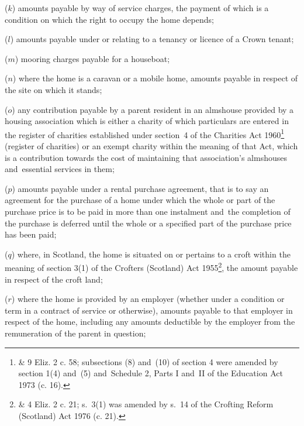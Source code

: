 \documentclass[12pt,a4paper]{article}
\begin{document}
\begin{enumerate}
($k$) 
amounts payable by way of  %
service charges, the payment of which is a condition on which the right to occupy the home depends;

($l$) 
amounts payable  %
under or relating to a tenancy or licence of a Crown tenant;

($m$) mooring charges payable for a houseboat;

($n$) where the home is a caravan or a mobile home, 
amounts payable  %
in respect of the site on which it stands;

($o$) any contribution payable by a parent resident in an almshouse provided by a housing association which is either a charity of which particulars are entered in the register of charities established under section~4 of the Charities Act 1960\footnote{ \& 9 Eliz. 2 c. 58; subsections (8) and~(10) of section 4 were amended by section 1(4) and~(5) and~Schedule 2, Parts I and~II of the Education Act 1973 (c. 16).} (register of charities) or an exempt charity within the meaning of that Act, which is a contribution towards the cost of maintaining that association’s almshouses and~essential services in them;%

($p$) 
amounts payable  %
under a rental purchase agreement, that is to say an agreement for the purchase of a home under which the whole or part of the purchase price is to be paid in more than one instalment and~the completion of the purchase is deferred until the whole or a specified part of the purchase price has been paid;

($q$) where, in Scotland, the home is situated on or pertains to a croft within the meaning of section 3(1) of the Crofters (Scotland) Act 1955\footnote{ \& 4 Eliz. 2 c. 21; s.~3(1) was amended by s.~14 of the Crofting Reform (Scotland) Act 1976 (c. 21).}, the 
amount payable  %
in respect of the croft land;

($r$) where the home is provided by an employer (whether under a condition or term in a contract of service or otherwise), 
amounts payable  %
to that employer in respect of the home, including 
any amounts deductible by the employer  %
from the remuneration of the parent in question;


\end{enumerate}
\end{document}
